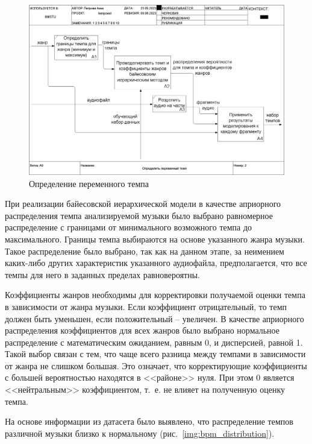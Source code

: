 \begin{figure}[h]
	\centering
	\includegraphics[scale=0.25]{inc/img/tempo_idef/02_A0.png}
	\caption{Определение переменного темпа}
	\label{img:tempo_1}
\end{figure}

При реализации байесовской иерархической модели в качестве априорного распределения темпа анализируемой музыки было выбрано равномерное распределение с границами от минимального возможного темпа до максимального. Границы темпа выбираются на основе указанного жанра музыки. Такое распределение было выбрано, так как на данном этапе, за неимением каких-либо других характеристик указанного аудиофайла, предполагается, что все темпы для него в заданных пределах равновероятны.

Коэффициенты жанров необходимы для корректировки получаемой оценки темпа в зависимости от жанра музыки. Если коэффициент отрицательный, то темп должен быть уменьшен, если положительный -- увеличен. В качестве априорного распределения коэффициентов для всех жанров было выбрано нормальное распределение с математическим ожиданием, равным 0, и дисперсией, равной 1. Такой выбор связан с тем, что чаще всего разница между темпами в зависимости от жанра не слишком большая. Это означает, что корректирующие коэффициенты с большей вероятностью находятся в <<районе>> нуля. При этом 0 является <<нейтральным>> коэффициентом, т.~е. не влияет на полученную оценку темпа.

На основе информации из датасета было выявлено, что распределение темпов различной музыки близко к нормальному (рис.~\ref{img:bpm_distribution}).

